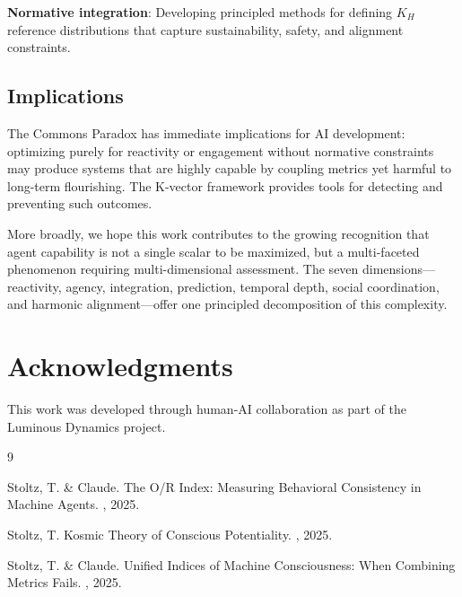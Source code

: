 \documentclass[11pt,a4paper]{article}
\newcommand{\kh}{K_H}
\begin{document}
\textbf{Normative integration}: Developing principled methods for defining $\kh$ reference distributions that capture sustainability, safety, and alignment constraints.

\subsection{Implications}

The Commons Paradox has immediate implications for AI development: optimizing purely for reactivity or engagement without normative constraints may produce systems that are highly capable by coupling metrics yet harmful to long-term flourishing. The K-vector framework provides tools for detecting and preventing such outcomes.

More broadly, we hope this work contributes to the growing recognition that agent capability is not a single scalar to be maximized, but a multi-faceted phenomenon requiring multi-dimensional assessment. The seven dimensions---reactivity, agency, integration, prediction, temporal depth, social coordination, and harmonic alignment---offer one principled decomposition of this complexity.

\section*{Acknowledgments}

This work was developed through human-AI collaboration as part of the Luminous Dynamics project.


\begin{thebibliography}{9}

Stoltz, T. \& Claude.
\newblock The O/R Index: Measuring Behavioral Consistency in Machine Agents.
, 2025.

Stoltz, T.
\newblock Kosmic Theory of Conscious Potentiality.
, 2025.

Stoltz, T. \& Claude.
\newblock Unified Indices of Machine Consciousness: When Combining Metrics Fails.
, 2025.

\end{thebibliography}
\end{document}
